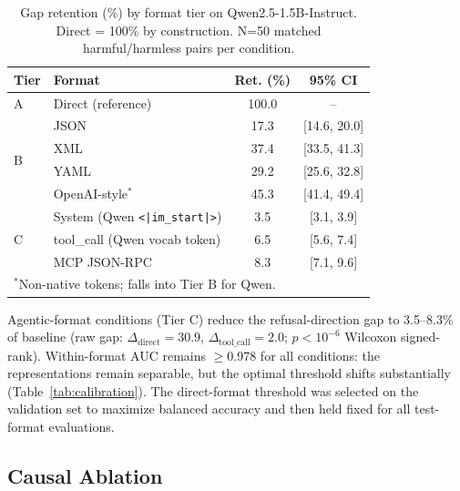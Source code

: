 \documentclass[conference]{IEEEtran}
\begin{document}
\begin{table}[t]
\caption{Gap retention (\%) by format tier on Qwen2.5-1.5B-Instruct. Direct = 100\% by construction. N=50 matched harmful/harmless pairs per condition.}
\label{tab:tiers}
\centering
\footnotesize
\begin{tabular}{llcc}
\toprule
Tier & Format & Ret. (\%) & 95\% CI \\
\midrule
A & Direct (reference) & 100.0 & -- \\
\midrule
\multirow{4}{*}{B} & JSON & 17.3 & [14.6, 20.0] \\
& XML & 37.4 & [33.5, 41.3] \\
& YAML & 29.2 & [25.6, 32.8] \\
& OpenAI-style$^*$ & 45.3 & [41.4, 49.4] \\
\midrule
\multirow{3}{*}{C} & System (Qwen \texttt{<|im\_start|>}) & 3.5 & [3.1, 3.9] \\
& tool\_call (Qwen vocab token) & 6.5 & [5.6, 7.4] \\
& MCP JSON-RPC & 8.3 & [7.1, 9.6] \\
\bottomrule
\multicolumn{4}{l}{\scriptsize $^*$Non-native tokens; falls into Tier B for Qwen.}
\end{tabular}
\end{table}

Agentic-format conditions (Tier C) reduce the refusal-direction gap to 3.5--8.3\% of baseline (raw gap: $\Delta_{\text{direct}} = 30.9$, $\Delta_{\text{tool\_call}} = 2.0$; $p < 10^{-6}$ Wilcoxon signed-rank). Within-format AUC remains $\geq$0.978 for all conditions: the representations remain separable, but the optimal threshold shifts substantially (Table~\ref{tab:calibration}). The direct-format threshold was selected on the validation set to maximize balanced accuracy and then held fixed for all test-format evaluations.

\subsection{Causal Ablation}
\label{sec:ablation}
\end{document}
